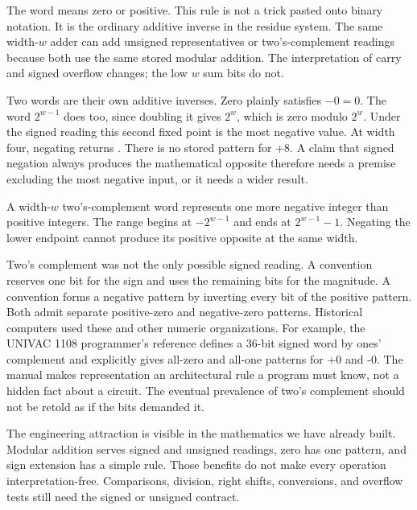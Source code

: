 The word  means zero or positive. This rule is not a
trick pasted onto binary notation. It is the ordinary
additive inverse in the residue system. The same width-\(w\) adder can add
unsigned representatives or two's-complement readings because both use the
same stored modular addition. The interpretation of carry and signed overflow
changes; the low \(w\) sum bits do not.

Two words are their own additive inverses. Zero plainly satisfies
\(-0=0\). The word \(2^{w-1}\) does too, since doubling it gives \(2^w\),
which is zero modulo \(2^w\). Under the signed reading this second fixed point
is the most negative value. At width four, negating  returns
. There is no stored pattern for +8. A claim that signed negation
always produces the mathematical opposite therefore needs a premise excluding
the most negative input, or it needs a wider result.

\begin{warning}[title={The signed range is asymmetric}]
A width-\(w\) two's-complement word represents one more negative integer than
positive integers. The range begins at \(-2^{w-1}\) and ends at
\(2^{w-1}-1\). Negating the lower endpoint cannot produce its positive
opposite at the same width.
\end{warning}

Two's complement was not the only possible signed reading. A
 convention reserves one bit for the sign and uses the
remaining bits for the magnitude. A  convention
forms a negative pattern by inverting every bit of the positive pattern.
Both admit separate positive-zero and negative-zero patterns. Historical
computers used these and other numeric organizations. For example, the
UNIVAC 1108 programmer's reference defines a 36-bit signed word by
ones' complement and explicitly gives all-zero and all-one patterns for +0
and -0.\autocite{univac1970processor} The manual makes representation an
architectural rule a program must know, not a hidden fact about a circuit.
The eventual prevalence of two's complement should not be retold as if the
bits demanded it.

The engineering attraction is visible in the mathematics we have already
built. Modular addition serves signed and unsigned readings, zero has one
pattern, and sign extension has a simple rule. Those benefits do not make
every operation interpretation-free. Comparisons, division, right shifts,
conversions, and overflow tests still need the signed or unsigned contract.

